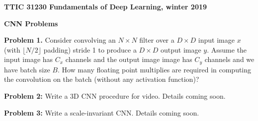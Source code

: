 \documentclass{article}
\newcommand{\solution}[1]{}
\begin{document}
\centerline{\bf TTIC 31230 Fundamentals of Deep Learning, winter 2019}
\centerline{\bf CNN Problems}

\bigskip
{\bf Problem 1.}  Consider convolving an $N \times N$ filter over a $D\times D$ input image $x$ (with $\lfloor N/2\rfloor$ padding) stride 1 to produce a $D \times D$ output image $y$.  Assume the input image has $C_x$ channels and the output image image has $C_y$ channels and we have batch size $B$.
How many floating point multiplies are required
in computing the convolution on the batch (without any activation function)?

\solution{$$BD^2N^2C_xC_y$$}

\bigskip
{\bf Problem 2:} Write a 3D CNN procedure for video. Details coming soon.

\bigskip
{\bf Problem 3:} Write a scale-invariant CNN.  Details coming soon.
\end{document}
